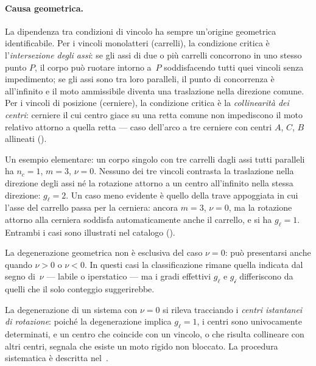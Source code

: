 \paragraph{Causa geometrica.}
La dipendenza tra condizioni di vincolo ha sempre un'origine geometrica
identificabile.
Per i vincoli monolatteri (carrelli), la condizione critica è
l'\emph{intersezione degli assi}: se gli assi di due o più carrelli
concorrono in uno stesso punto $P$, il corpo può ruotare intorno a~$P$
soddisfacendo tutti quei vincoli senza impedimento; se gli assi sono
tra loro paralleli, il punto di concorrenza è all'infinito e il moto
ammissibile diventa una traslazione nella direzione comune.
Per i vincoli di posizione (cerniere), la condizione critica è la
\emph{collinearità dei centri}: cerniere il cui centro giace su una
retta comune non impediscono il moto relativo attorno a quella retta
--- caso dell'arco a tre cerniere con centri $A$, $C$, $B$ allineati
().

Un esempio elementare: un corpo singolo con tre carrelli dagli assi
tutti paralleli ha $n_c = 1$, $m = 3$, $\nu = 0$.
Nessuno dei tre vincoli contrasta la traslazione nella direzione degli
assi né la rotazione attorno a un centro all'infinito nella stessa
direzione: $g_\ell = 2$.
Un caso meno evidente è quello della trave appoggiata in cui l'asse
del carrello passa per la cerniera: ancora $m = 3$, $\nu = 0$, ma
la rotazione attorno alla cerniera soddisfa automaticamente anche il
carrello, e si ha $g_\ell = 1$.
Entrambi i casi sono illustrati nel catalogo ().

\begin{oss}
	La degenerazione geometrica non è esclusiva del caso $\nu = 0$:
	può presentarsi anche quando $\nu > 0$ o $\nu < 0$.
	In questi casi la classificazione rimane quella indicata dal segno
	di~$\nu$ --- labile o iperstatico --- ma i gradi effettivi $g_\ell$
	e $g_{\mathscr{i}}$ differiscono da quelli che il solo conteggio
	suggerirebbe.
\end{oss}

\noindent
La degenerazione di un sistema con $\nu = 0$ si rileva tracciando i
\emph{centri istantanei di rotazione}:
poiché la degenerazione implica $g_\ell = 1$, i centri sono univocamente
determinati, e un centro che coincide con un vincolo, o che risulta
collineare con altri centri, segnala che esiste un moto rigido non bloccato.
La procedura sistematica è descritta nel~.

